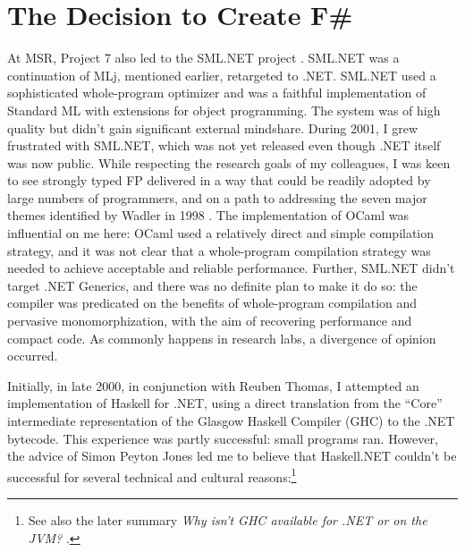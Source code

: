 \documentclass[acmsmall,screen]{acmart}
\begin{document}
\section*{The Decision to Create F\#}

At MSR, Project 7 also led to the SML.NET project \citep{Benton2004}.  SML.NET was a continuation of MLj, mentioned earlier, retargeted to
.NET.  SML.NET used a sophisticated whole-program optimizer and was a faithful implementation of Standard ML
with extensions for object programming. The system was of high quality but didn’t gain significant external mindshare.   During 2001, I grew frustrated with SML.NET,
which was not yet released even though .NET itself was now public. While respecting the research goals of my colleagues, I was keen to see strongly typed FP delivered
in a way that could be readily adopted by large numbers of programmers, and on a path to addressing the seven major themes identified by Wadler in 1998 \citep{Wadler1998}.  The
implementation of OCaml was influential on me here: OCaml used a relatively direct and simple compilation strategy, and it was not clear that a whole-program
compilation strategy was needed to achieve acceptable and reliable performance.  Further, SML.NET didn’t target .NET Generics, and there was no definite plan to
make it do so: the compiler was predicated on the benefits of whole-program compilation and pervasive monomorphization, with the aim of recovering performance
and compact code.  As commonly happens in research labs, a divergence of opinion occurred.


Initially, in late 2000, in conjunction with Reuben Thomas, I attempted an implementation of Haskell for .NET, using a direct translation from the “Core” intermediate
representation of the Glasgow Haskell Compiler (GHC) to the .NET bytecode. This experience was partly successful: small programs ran. However, the advice of Simon
Peyton Jones led me to believe that Haskell.NET couldn’t be successful for several technical and cultural reasons:\footnote{See also the later
summary \textit{Why isn't GHC available for .NET or on the JVM?} \citep{RefGHCDotNet}.}
\end{document}
